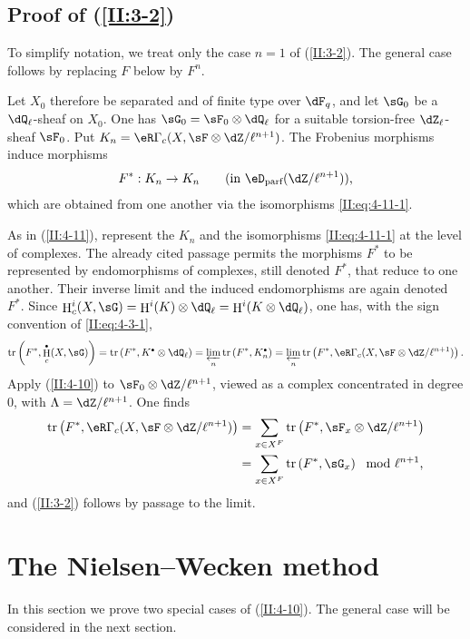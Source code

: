 \documentclass[12pt,oneside,english]{smfbook}
\DeclareMathOperator{\h}{H}
\DeclareMathOperator{\tr}{tr}
\let\oldbullet\bullet
\renewcommand{\bullet}{\textnormal{\tiny$\oldbullet$}}
\begin{document}
\subsection{Proof of \texorpdfstring{(\ref{II:3-2})}{(3.2)}}\label{II:4-13}

To simplify notation, we treat only the case $n=1$ of (\ref{II:3-2}). The general case follows by replacing $F$ below by $F^n$.

Let $X_0$ therefore be separated and of finite type over $\dF_q$, and let $\sG_0$ be a $\dQ_\ell$-sheaf on $X_0$. One has $\sG_0=\sF_0\otimes\dQ_\ell$ for a suitable torsion-free $\dZ_\ell$-sheaf $\sF_0$. Put $K_n=\eR\Gamma_c(X,\sF\otimes\dZ/\ell^{n+1})$. The Frobenius morphisms induce morphisms
\[
  F^* : K_n\to K_n \qquad \text{(in $\eD_\text{parf}(\dZ/\ell^{n+1})$),}
\]
which are obtained from one another via the isomorphisms \eqref{II:eq:4-11-1}.

As in (\ref{II:4-11}), represent the $K_n$ and the isomorphisms \eqref{II:eq:4-11-1} at the level of complexes. The already cited passage \cite[XI.3.3]{sga5} permits the morphisms $F^*$ to be represented by endomorphisms of complexes, still denoted $F^*$, that reduce to one another. Their inverse limit and the induced endomorphisms are again denoted $F^*$. Since $\h_c^i(X,\sG)=\h^i(K)\otimes\dQ_\ell=\h^i(K\otimes\dQ_\ell)$, one has, with the sign convention of \eqref{II:eq:4-3-1},
\[
  \tr\left(F^*, \h_c^\bullet(X,\sG)\right) = \tr\left(F^*,K^\bullet\otimes\dQ_\ell\right) = \varprojlim_n \tr\left(F^*,K_n^\bullet\right) = \varprojlim_n \tr\left(F^*,\eR\Gamma_c(X,\sF\otimes\dZ/\ell^{n+1})\right) \text{.}
\]
Apply (\ref{II:4-10}) to $\sF_0\otimes\dZ/\ell^{n+1}$, viewed as a complex concentrated in degree $0$, with $\Lambda=\dZ/\ell^{n+1}$. One finds
\begin{align*}
  \tr\left(F^*,\eR\Gamma_c(X,\sF\otimes\dZ/\ell^{n+1})\right)
    &= \sum_{x\in X^F} \tr\left(F^*,\sF_x\otimes\dZ/\ell^{n+1}\right) \\
    &= \sum_{x\in X^F} \tr\left(F^*,\sG_x\right) \mod \ell^{n+1} \text{,}
\end{align*}
and (\ref{II:3-2}) follows by passage to the limit.

\section{The Nielsen--Wecken method}\label{II:5}

In this section we prove two special cases of (\ref{II:4-10}). The general case will be considered in the next section.
\end{document}
